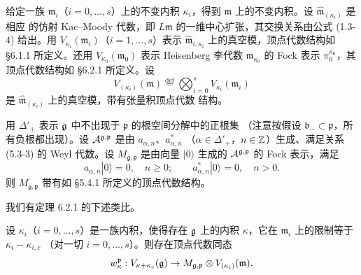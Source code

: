 给定一族 $\mathfrak m_i$（$i=0,\dots,s$）上的不变内积 $\kappa_i$，得到
$\mathfrak m$ 上的不变内积。设 $\widehat{\mathfrak m}_{(\kappa_i)}$ 是相应
的仿射 Kac--Moody 代数，即 $L\mathfrak m$ 的一维中心扩张，其交换关系由公式
(1.3-4) 给出。用 $V_{\kappa_i}(\mathfrak m_i)$（$i=1,\dots,s$）表示
$\widehat{\mathfrak m}_{i,\kappa_i}$ 上的真空模，顶点代数结构如 \S6.1.1
所定义。还用 $V_{\kappa_0}(\mathfrak m_0)$ 表示 Heisenberg 李代数
$\mathfrak m_{\kappa_0}$ 的 Fock 表示 $\pi^{\kappa_0}_0$，其顶点代数结构如
\S6.2.1 所定义。设
\[
    V_{(\kappa_i)}(\mathfrak m)\overset{\mathrm{def}}{=}
    \bigotimes_{i=0}^sV_{\kappa_i}(\mathfrak m_i)
\]
是 $\widehat{\mathfrak m}_{(\kappa_i)}$ 上的真空模，带有张量积顶点代数
结构。

用 $\Delta'_+$ 表示 $\mathfrak{g}$ 中不出现于 $\mathfrak p$ 的根空间分解中的正根集
（注意按假设 $\mathfrak b_-\subset\mathfrak p$，所有负根都出现）。设
$\mathcal{A}^{\mathfrak g,\mathfrak p}$ 是由 $a_{\alpha,n}$、$a^*_{\alpha,n}$
（$\alpha\in\Delta'_+$，$n\in\mathbb{Z}$）生成、满足关系 (5.3-3) 的 Weyl 代数。设
$M_{\mathfrak g,\mathfrak p}$ 是由向量 $|0\rangle$ 生成的
$\mathcal{A}^{\mathfrak g,\mathfrak p}$ 的 Fock 表示，满足
\[
    a_{\alpha,n}|0\rangle=0,\quad n\ge0;\qquad
    a^*_{\alpha,n}|0\rangle=0,\quad n>0.
\]
则 $M_{\mathfrak g,\mathfrak p}$ 带有如 \S5.4.1 所定义的顶点代数结构。

我们有定理 6.2.1 的下述类比。

\renewcommand{\thetheorem}{6.3.1}
\begin{theorem}
    设 $\kappa_i$（$i=0,\dots,s$）是一族内积，使得存在 $\mathfrak{g}$ 上的内积
    $\kappa$，它在 $\mathfrak m_i$ 上的限制等于 $\kappa_i-\kappa_{i,c}$
    （对一切 $i=0,\dots,s$）。则存在顶点代数同态
    \[
        w^{\mathfrak p}_\kappa:V_{\kappa+\kappa_c}(\mathfrak{g})
        \to M_{\mathfrak g,\mathfrak p}\otimes V_{(\kappa_i)}(\mathfrak m).
    \]
\end{theorem}

